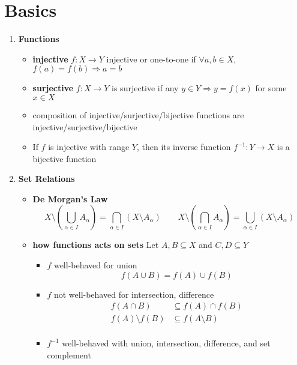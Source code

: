 \documentclass[10.5pt]{article}
\begin{document}
\section*{Basics}

\begin{enumerate}
    \item \textbf{Functions}
    \begin{itemize}
        \item \textbf{injective} $f:X\to Y$ injective or one-to-one if $\forall a,b\in X$, $f(a) = f(b) \Rightarrow a=b$
        \item \textbf{surjective} $f:X\to Y$ is surjective if any $y \in Y \Rightarrow y = f(x)$ for some $x\in X$
        \item composition of injective/surjective/bijective functions are injective/surjective/bijective
        \item If $f$ is injective with range $Y$, then its inverse function $f^{-1}: Y\to X$ is a bijective function
    \end{itemize}
    \item \textbf{Set Relations}
    \begin{itemize}
        \item \textbf{De Morgan's Law}
        \[
            X \setminus \left( \bigcup_{\alpha \in I} A_{\alpha} \right)
            = \bigcap_{\alpha \in I} \left( X \setminus A_{\alpha} \right)
            \qquad 
            X \setminus \left( \bigcap_{\alpha \in I} A_{\alpha} \right)
            = \bigcup_{\alpha \in I} \left( X \setminus A_{\alpha} \right)
        \]
        \item \textbf{how functions acts on sets} Let $A,B\subseteq X$ and $C,D\subseteq Y$
        \begin{itemize}
            \item $f$ well-behaved for union
            \[
                f(A\cup B) = f(A) \cup f(B)    
            \]
            \item $f$ not well-behaved for intersection, difference
            \begin{align*}
                f(A\cap B) &\subseteq f(A) \cap f(B) \\
                f(A) \setminus f(B) &\subseteq f(A\setminus B) \\
            \end{align*}
            \item $f^{-1}$ well-behaved with union, intersection, difference, and set complement
            \begin{align*}

\end{align*}
\end{itemize}
\end{itemize}
\end{enumerate}
\end{document}
